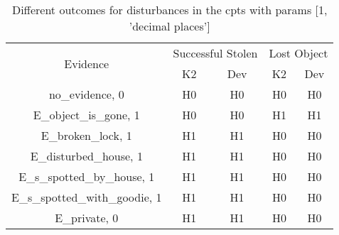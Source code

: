 \begin{table}\begin{tabular}{c|cc|cc}\toprule\multirow{2}{*}{Evidence} & \multicolumn{2}{c}{Successful Stolen} & \multicolumn{2}{c}{Lost Object} \\& {K2} & {Dev} & {K2} & {Dev} \\\midrule
no\_evidence, 0 & H0&H0&H0&H0\\E\_object\_is\_gone, 1 & H0&H0&H1&H1\\E\_broken\_lock, 1 & H1&H1&H0&H0\\E\_disturbed\_house, 1 & H1&H1&H0&H0\\E\_s\_spotted\_by\_house, 1 & H1&H1&H0&H0\\E\_s\_spotted\_with\_goodie, 1 & H1&H1&H0&H0\\E\_private, 0 & H1&H1&H0&H0\\\bottomrule\end{tabular}\caption{Different outcomes for disturbances in the cpts with params [1, 'decimal places']}\end{table}